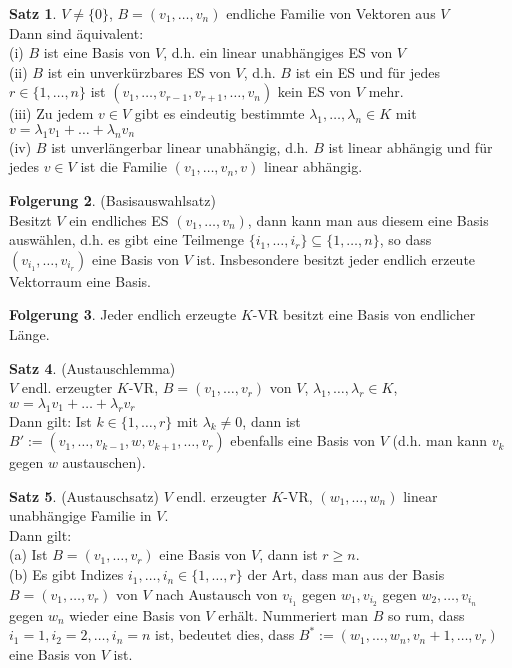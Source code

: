 \documentclass[10pt,a4paper,numbers=endperiod]{scrartcl}
\theoremstyle{definition}
\newtheorem{satz}{Satz}[section]
\newtheorem{folg}[satz]{Folgerung}
\begin{document}
\begin{satz}
	$V \neq \{0\}$, $B=(v_1, \ldots, v_n)$ endliche Familie von Vektoren aus $V$\\
	Dann sind äquivalent:\\
	(i) $B$ ist eine Basis von $V$, d.h. ein linear unabhängiges ES von $V$\\
	(ii) $B$ ist ein unverkürzbares ES von $V$, d.h. $B$ ist ein ES und für jedes $r \in \{1, \ldots,n\}$ ist $(v_1,\ldots,v_{r-1},v_{r+1},\ldots,v_n)$ kein ES von $V$ mehr.\\
	(iii) Zu jedem $v \in V$ gibt es eindeutig bestimmte $\lambda_1,\ldots,\lambda_n \in K$ mit $v=\lambda_1v_1+\dots+\lambda_nv_n$\\
	(iv) $B$ ist unverlängerbar linear unabhängig, d.h. $B$ ist linear abhängig und für jedes $v \in V$ ist die Familie $(v_1,\ldots,v_n,v)$ linear abhängig.
\end{satz}
\newpage
\begin{folg}
	(Basisauswahlsatz)\\
	Besitzt $V$ ein endliches ES $(v_1,\ldots,v_n)$, dann kann man aus diesem eine Basis auswählen, d.h. es gibt eine Teilmenge $\{i_1,\ldots,i_r\}\subseteq\{1,\ldots,n\}$, so dass $(v_{i_1},\ldots,v_{i_r})$ eine Basis von $V$ ist. Insbesondere besitzt jeder endlich erzeute Vektorraum eine Basis. 
\end{folg}

\begin{folg}
	Jeder endlich erzeugte $K$-VR besitzt eine Basis von endlicher Länge.
\end{folg}

\begin{satz}
	(Austauschlemma)\\
	$V$ endl. erzeugter $K$-VR, $B = (v_1,\ldots,v_r)$ von $V$, $\lambda_1,\ldots,\lambda_r \in K$, $w=\lambda_1v_1+\dots+\lambda_rv_r$\\
	Dann gilt: Ist $k \in \{1,\ldots,r\}$ mit $\lambda_k \neq 0$, dann ist $B' := (v_1,\ldots,v_{k-1},w,v_{k+1},\ldots,v_r)$ ebenfalls eine Basis von $V$ (d.h. man kann $v_k$ gegen $w$ austauschen).
\end{satz}

\begin{satz}
	(Austauschsatz) $V$ endl. erzeugter $K$-VR, $(w_1,\ldots,w_n)$ linear unabhängige Familie in $V$.\\
	Dann gilt:\\
	(a) Ist $B = (v_1,\ldots,v_r)$ eine Basis von $V$, dann ist $r\geq n$.\\
	(b) Es gibt Indizes $i_1,\ldots,i_n \in \{1,\ldots,r\}$ der Art, dass man aus der Basis $B=(v_1,\ldots,v_r)$ von $V$ nach Austausch von $v_{i_1}$ gegen $w_1,v_{i_2}$ gegen $w_2,\ldots,v_{i_n}$ gegen $w_n$ wieder eine Basis von $V$ erhält. Nummeriert man $B$ so rum, dass $i_1=1,i_2=2,\ldots,i_n=n$ ist, bedeutet dies, dass $B^* := (w_1,\ldots,w_n,v_n+1,\ldots, v_r)$ eine Basis von $V$ ist.
\end{satz}
\end{document}

